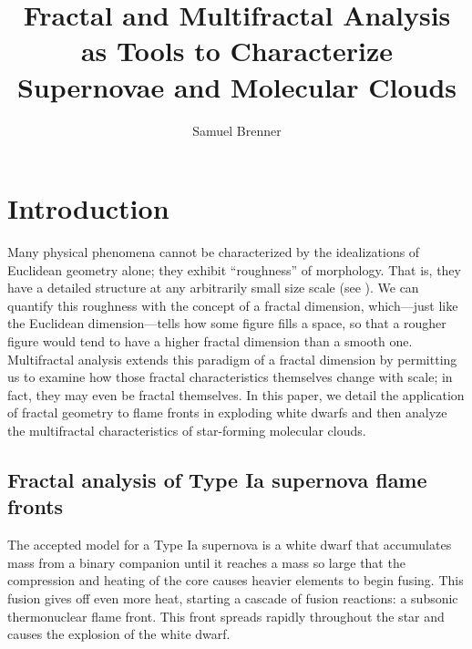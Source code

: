\documentclass{emulateapj}
\begin{document}
%
\title{Fractal and Multifractal Analysis as Tools to Characterize Supernovae and Molecular Clouds}
%
\author{Samuel Brenner}
%
%
%
%
%
\begin{abstract}
\end{abstract}
%
%
%
%
%
%

\section{Introduction}
Many physical phenomena cannot be characterized by the idealizations of Euclidean geometry alone; they exhibit ``roughness'' of morphology. That is, they have a detailed structure at any arbitrarily small size scale (see \cite{Falconer2003}). We can quantify this roughness with the concept of a fractal dimension, which---just like the Euclidean dimension---tells how some figure fills a space, so that a rougher figure would tend to have a higher fractal dimension than a smooth one. Multifractal analysis extends this paradigm of a fractal dimension by permitting us to examine how those fractal characteristics themselves change with scale; in fact, they may even be fractal themselves. In this paper, we detail the application of fractal geometry to flame fronts in exploding white dwarfs and then analyze the multifractal characteristics of star-forming molecular clouds.

\subsection{Fractal analysis of Type Ia supernova flame fronts}
The accepted model for a Type Ia supernova is a white dwarf that accumulates mass from a binary companion until it reaches a mass so large that the compression and heating of the core causes heavier elements to begin fusing. This fusion gives off even more heat, starting a cascade of fusion reactions: a subsonic thermonuclear flame front. This front spreads rapidly throughout the star and causes the explosion of the white dwarf.
\end{document}
